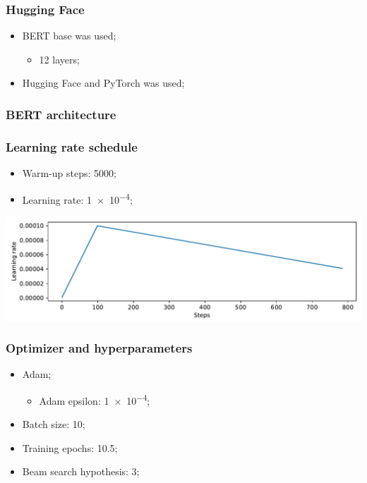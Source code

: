 \documentclass{beamer}
\begin{document}
\begin{frame}
  \frametitle{Hugging Face}

  \begin{itemize}
    \item BERT base was used;
          \begin{itemize}
            \item 12 layers;
          \end{itemize}
    \item Hugging Face and PyTorch was used;
  \end{itemize}

\end{frame}

\begin{frame}
  \frametitle{BERT architecture}

\end{frame}

\begin{frame}
  \frametitle{Learning rate schedule}

  \begin{itemize}
    \item Warm-up steps: \num{5000};
    \item Learning rate: \num{1e-4};
  \end{itemize}

  \bigbreak
  \bigbreak

  \includegraphics[width=\textwidth]{../images/warmup_linear_schedule.pdf}
\end{frame}

\begin{frame}
  \frametitle{Optimizer and hyperparameters}

  \begin{itemize}
    \item Adam;
          \begin{itemize}
            \item Adam epsilon: \num{1e-4};
          \end{itemize}
    \item Batch size: \num{10};
    \item Training epochs: \num{10.5};
    \item Beam search hypothesis: \num{3};
  \end{itemize}
\end{frame}
\end{document}
